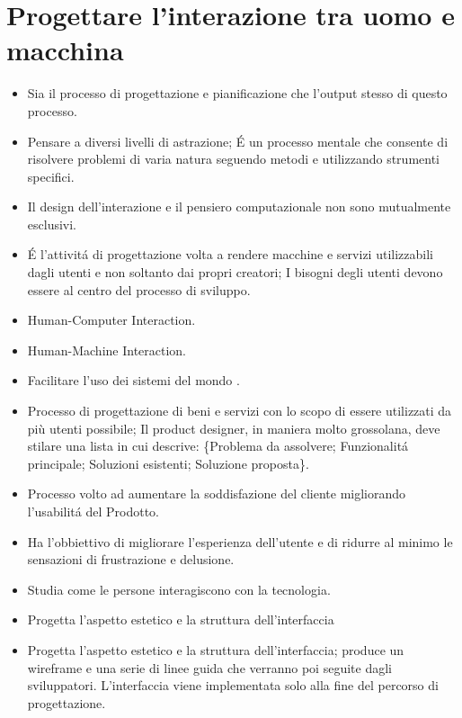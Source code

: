\chapter{Progettare l'interazione tra uomo e macchina}

\begin{itemize}
    \item {} Sia il processo di progettazione e pianificazione che l'output stesso di questo processo.
    \item {} Pensare a diversi livelli di astrazione; \'E un processo mentale che consente di risolvere problemi di varia natura seguendo metodi e utilizzando strumenti specifici.
    \item Il design dell'interazione e il pensiero computazionale non sono mutualmente esclusivi.
    \item {} \'E l'attivit\'a di progettazione volta a rendere macchine e servizi utilizzabili dagli utenti e non soltanto dai propri creatori; I bisogni degli utenti devono essere al centro del processo di sviluppo.
    \item {} Human-Computer Interaction.
    \item {} Human-Machine Interaction.
    \item {} Facilitare l'uso dei sistemi del mondo .
    \item {} Processo di progettazione di beni e servizi con lo scopo di essere utilizzati da pi\`u utenti possibile; Il product designer, in maniera molto grossolana, deve stilare una lista in cui descrive: \{Problema da assolvere; Funzionalit\'a principale; Soluzioni esistenti; Soluzione proposta\}.
    \item {} Processo volto ad aumentare la soddisfazione del cliente migliorando l'usabilit\'a del Prodotto.
    \item {} Ha l'obbiettivo di migliorare l'esperienza dell'utente e di ridurre al minimo le sensazioni di frustrazione e delusione.
    \item {} Studia come le persone interagiscono con la tecnologia.
    \item {} Progetta l'aspetto estetico e la struttura dell'inter\-faccia
    \item {} Progetta l'aspetto estetico e la struttura dell'interfaccia; produce un wireframe e una serie di linee guida che verranno poi seguite dagli sviluppatori. L'interfaccia viene implementata solo alla fine del percorso di progettazione.
\end{itemize}